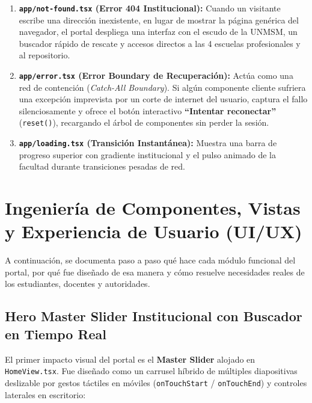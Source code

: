 \documentclass[12pt,a4paper,oneside]{report}
\begin{document}
\begin{enumerate}[label=\textbf{\arabic*.}, leftmargin=1.1cm]
  \item \textbf{\texttt{app/not-found.tsx} (Error 404 Institucional):} Cuando un visitante escribe una dirección inexistente, en lugar de mostrar la página genérica del navegador, el portal despliega una interfaz con el escudo de la UNMSM, un buscador rápido de rescate y accesos directos a las 4 escuelas profesionales y al repositorio.
  \item \textbf{\texttt{app/error.tsx} (Error Boundary de Recuperación):} Actúa como una red de contención (\textit{Catch-All Boundary}). Si algún componente cliente sufriera una excepción imprevista por un corte de internet del usuario, captura el fallo silenciosamente y ofrece el botón interactivo \textbf{``Intentar reconectar''} (\texttt{reset()}), recargando el árbol de componentes sin perder la sesión.
  \item \textbf{\texttt{app/loading.tsx} (Transición Instantánea):} Muestra una barra de progreso superior con gradiente institucional y el pulso animado de la facultad durante transiciones pesadas de red.
\end{enumerate}

\chapter{Ingeniería de Componentes, Vistas y Experiencia de Usuario (UI/UX)}

A continuación, se documenta paso a paso qué hace cada módulo funcional del portal, por qué fue diseñado de esa manera y cómo resuelve necesidades reales de los estudiantes, docentes y autoridades.

\section{Hero Master Slider Institucional con Buscador en Tiempo Real}
El primer impacto visual del portal es el \textbf{Master Slider} alojado en \texttt{HomeView.tsx}. Fue diseñado como un carrusel híbrido de múltiples diapositivas deslizable por gestos táctiles en móviles (\texttt{onTouchStart} / \texttt{onTouchEnd}) y controles laterales en escritorio:
\end{document}
